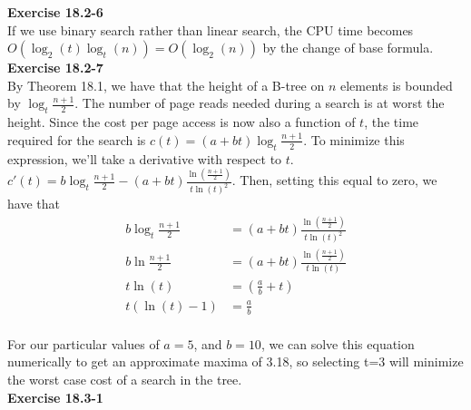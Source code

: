 \documentclass{article}
\begin{document}
\noindent\textbf{Exercise 18.2-6}\\

If we use binary search rather than linear search, the CPU time becomes $O(\log_2(t)\log_t(n)) = O(\log_2(n))$ by the change of base formula.\\

\noindent\textbf{Exercise 18.2-7}\\

By Theorem 18.1, we have that the height  of a B-tree on $n$ elements is bounded by $\log_t \frac{n+1}{2}$. The number of page reads needed during a search is at worst the height. Since the cost per page access is now also a function of $t$, the time required for the search is $c(t) = (a+bt)\log_t \frac{n+1}{2}$. To minimize this expression, we'll take a derivative with respect to $t$. $c'(t) = b \log_t\frac{n+1}{2} - (a+bt) \frac{\ln\left(\frac{n+1}{2}\right)}{t \ln(t)^2}$. Then, setting this equal to zero, we have that 
\begin{align*}
b \log_t\frac{n+1}{2} &= (a+bt) \frac{\ln\left(\frac{n+1}{2}\right)}{t \ln(t)^2}\\
b \ln\frac{n+1}{2} &= (a+bt) \frac{\ln\left(\frac{n+1}{2}\right)}{t \ln(t)}\\
t\ln(t) &=(\frac{a}{b} +t)\\
t(\ln(t)-1) &= \frac{a}{b}\\
\end{align*}

For our particular values of $a=5$, and $b=10$, we can solve this equation numerically to get an approximate maxima of 3.18, so selecting t=3 will minimize the worst case cost of a search in the tree.\\



\noindent\textbf{Exercise 18.3-1}\\


\end{document}
